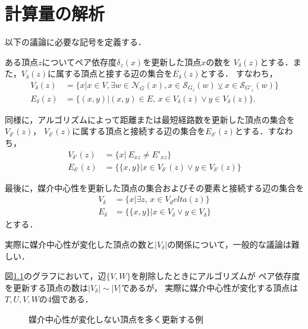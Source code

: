 \chapter{計算量の解析}
\label{chap:complexity-analysis}

以下の議論に必要な記号を定義する．

\begin{definition}
  ある頂点$z$についてペア依存度$\delta_z(x)$を更新した頂点$x$の数を
  $V_\delta(z)$とする．また，$V_\delta(z)$に属する頂点と接する辺の集合を$E_\delta(z)$とする．
  すなわち，
  \begin{equation*}
    \begin{aligned}
      V_\delta(z)&=\{x|x\in V,\exists w\in\mathcal{N}_G(x),
      x\in\mathcal{S}_{G_z}(w)\veebar x\in\mathcal{S}_{G'_z}(w)\}\\
      E_\delta(z)&=\{(x,y)|(x,y)\in E,\,x\in V_\delta(z)\lor y\in V_\delta(z)\}.
    \end{aligned}
  \end{equation*}

  同様に，アルゴリズムによって距離または最短経路数を更新した頂点の集合を$V_{\delta'}(z)$，
  $V_{\delta'}(z)$に属する頂点と接続する辺の集合を$E_{\delta'}(z)$とする．すなわち，
  \begin{equation*}
    \begin{aligned}
      V_{\delta'}(z)&=\{x|\:E_{xz}\neq E'_{xz}\} \\
      E_{\delta'}(z)&=\{\{x,y\}|x\in V_{\delta'}(z)\lor y\in V_{\delta'}(z)\}
    \end{aligned}
  \end{equation*}

  最後に，媒介中心性を更新した頂点の集合およびその要素と接続する辺の集合を
  \begin{equation*}
    \begin{aligned}
      V_\delta&=\{x|\exists z,\,x\in V_delta(z)\} \\
      E_\delta&=\{\{x,y\}|x\in V_\delta\lor y\in V_\delta\}
    \end{aligned}
  \end{equation*}
  とする．
\end{definition}

実際に媒介中心性が変化した頂点の数と$\lvert V_\delta\rvert$の関係について，一般的な議論は難しい．

\begin{example}
  図\ref{fig:bc-many-phony}のグラフにおいて，辺$\{V,W\}$を削除したときにアルゴリズムが
  ペア依存度を更新する頂点の数は$\lvert V_\delta\rvert\sim \lvert V\rvert$であるが，
  実際に媒介中心性が変化する頂点は$T,U,V,W$の$4$個である．

  \begin{figure}[tb]
    \centering
    \def\svgwidth{.8\linewidth}
    
    \caption{媒介中心性が変化しない頂点を多く更新する例}
    \label{fig:bc-many-phony}
  \end{figure}
\end{example}

